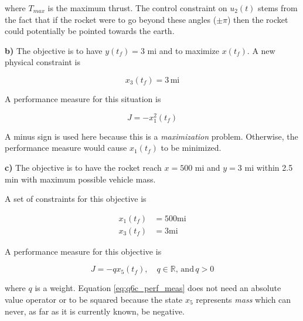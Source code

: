 \noindent where $T_{max}$ is the maximum thrust. The control constraint on $u_2(t)$
stems from the fact that if the rocket were to go beyond these angles ($\pm \pi$)
then the rocket could potentially be pointed towards the earth.

\noindent \textbf{b)}
The objective is to have $y(t_f) = 3$ mi and to maximize $x(t_f)$. A new
physical constraint is

\begin{equation}
  x_3(t_f) = 3 \, \text{mi} \nonumber
\end{equation}

A performance measure for this situation is

\begin{equation}
  J = -x_1^2(t_f) \nonumber
\end{equation}

\noindent A minus sign is used here because this is a \textit{maximization}
problem. Otherwise, the performance measure would cause $x_1(t_f)$ to be
minimized.

\noindent \textbf{c)}
The objective is to have the rocket reach $x = 500$ mi and $y = 3$ mi within
2.5 min with maximum possible vehicle mass.

A set of constraints for this objective is

\begin{align}
  x_1(t_f) &= 500 \text{mi} \nonumber \\
  x_3(t_f) &= 3 \text{mi} \nonumber
\end{align}

A performance measure for this objective is

\begin{equation} \label{eq:q6c_perf_meas}
  J = - q x_5(t_f), \quad q \in \mathbb{R}, \, \text{and} \, q > 0
\end{equation}

\noindent where $q$ is a weight. Equation \ref{eq:q6c_perf_meas} does not
need an absolute value operator or to be squared because the state $x_5$
represents \textit{mass} which can never, as far as it is currently known, be
negative.
